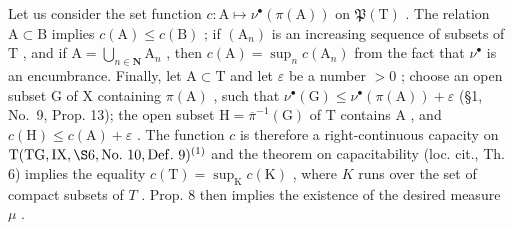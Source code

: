 Let us consider the set function \(c: \mathrm{A} \mapsto \nu^{\bullet}(\pi(\mathrm{A}))\) on \(\mathfrak{P}(\mathrm{T})\) . The relation \(\mathrm{A} \subset \mathrm{B}\) implies \(c(\mathrm{A}) \leqslant c(\mathrm{B})\) ; if \((\mathrm{A}_n)\) is an increasing sequence of subsets of \(\mathrm{T}\) , and if \(\mathrm{A} = \bigcup_{n \in \mathbf{N}} \mathrm{A}_n\) , then \(c(\mathrm{A}) = \sup_n c(\mathrm{A}_n)\) from the fact that \(\nu^{\bullet}\) is an encumbrance. Finally, let \(\mathrm{A} \subset \mathrm{T}\) and let \(\varepsilon\) be a number \(> 0\) ; choose an open subset \(\mathrm{G}\) of \(\mathrm{X}\) containing \(\pi(\mathrm{A})\) , such that \(\nu^{\bullet}(\mathrm{G}) \leqslant \nu^{\bullet}(\pi(\mathrm{A})) + \varepsilon\) (§1, No.~9, Prop. 13); the open subset \(\mathrm{H} = \overline{\pi}^{-1}(\mathrm{G})\) of \(\mathrm{T}\) contains \(\mathrm{A}\) , and \(c(\mathrm{H}) \leqslant c(\mathrm{A}) + \varepsilon\) . The function \(c\) is therefore a right-continuous capacity on \(\mathrm{T} (\mathrm{TG},\mathrm{IX},\S 6,\mathrm{No.~10},\mathrm{Def.~9})^{(1)}\) and the theorem on capacitability (loc. cit., Th. 6) implies the equality \(c(\mathrm{T}) = \sup_{\mathrm{K}}c(\mathrm{K})\) , where \(K\) runs over the set of compact subsets of \(T\) . Prop. 8 then implies the existence of the desired measure \(\mu\) .


